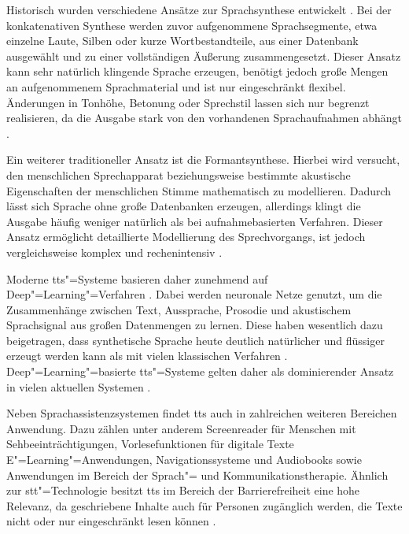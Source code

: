 Historisch wurden verschiedene Ansätze zur Sprachsynthese entwickelt \autocite{speechtoTextTexttoSpeechRecognition}. Bei der konkatenativen Synthese werden zuvor aufgenommene Sprachsegmente, etwa einzelne Laute, Silben oder kurze Wortbestandteile, aus einer Datenbank ausgewählt und zu einer vollständigen Äußerung zusammengesetzt. Dieser Ansatz kann sehr natürlich klingende Sprache erzeugen, benötigt jedoch große Mengen an aufgenommenem Sprachmaterial und ist nur eingeschränkt flexibel. Änderungen in Tonhöhe, Betonung oder Sprechstil lassen sich nur begrenzt realisieren, da die Ausgabe stark von den vorhandenen Sprachaufnahmen abhängt \autocite{speechtoTextTexttoSpeechRecognition}.

Ein weiterer traditioneller Ansatz ist die Formantsynthese. Hierbei wird versucht, den menschlichen Sprechapparat beziehungsweise bestimmte akustische Eigenschaften der menschlichen Stimme mathematisch zu modellieren. Dadurch lässt sich Sprache ohne große Datenbanken erzeugen, allerdings klingt die Ausgabe häufig weniger natürlich als bei aufnahmebasierten Verfahren. Dieser Ansatz ermöglicht detaillierte Modellierung des Sprechvorgangs, ist jedoch vergleichsweise komplex und rechenintensiv \autocite{speechtoTextTexttoSpeechRecognition}.

Moderne \gls{tts}"=Systeme basieren daher zunehmend auf Deep"=Learning"=Verfahren \autocite{speechtoTextTexttoSpeechRecognition,endtoEndTexttoSpeech}. Dabei werden neuronale Netze genutzt, um die Zusammenhänge zwischen Text, Aussprache, Prosodie und akustischem Sprachsignal aus großen Datenmengen zu lernen. Diese haben wesentlich dazu beigetragen, dass synthetische Sprache heute deutlich natürlicher und flüssiger erzeugt werden kann als mit vielen klassischen Verfahren \autocite{endtoEndTexttoSpeech}. Deep"=Learning"=basierte \gls{tts}"=Systeme gelten daher als dominierender Ansatz in vielen aktuellen Systemen \autocite{speechtoTextTexttoSpeechRecognition}.

Neben Sprachassistenzsystemen findet \gls{tts} auch in zahlreichen weiteren Bereichen Anwendung. Dazu zählen unter anderem Screenreader für Menschen mit Sehbeeinträchtigungen, Vorlesefunktionen für digitale Texte E"=Learning"=Anwendungen, Navigationssysteme und Audiobooks sowie Anwendungen im Bereich der Sprach"= und Kommunikationstherapie. Ähnlich zur \gls{stt}"=Technologie besitzt \gls{tts} im Bereich der Barrierefreiheit  eine hohe Relevanz, da geschriebene Inhalte auch für Personen zugänglich werden, die Texte nicht oder nur eingeschränkt lesen können \autocite{speechtoTextTexttoSpeechRecognition}.


